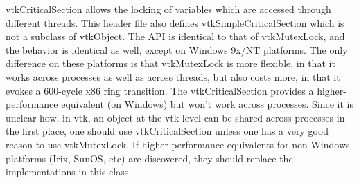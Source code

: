 vtk\-Critical\-Section allows the locking of variables which are accessed through different threads. This header file also defines vtk\-Simple\-Critical\-Section which is not a subclass of vtk\-Object. The A\-P\-I is identical to that of vtk\-Mutex\-Lock, and the behavior is identical as well, except on Windows 9x/\-N\-T platforms. The only difference on these platforms is that vtk\-Mutex\-Lock is more flexible, in that it works across processes as well as across threads, but also costs more, in that it evokes a 600-\/cycle x86 ring transition. The vtk\-Critical\-Section provides a higher-\/performance equivalent (on Windows) but won't work across processes. Since it is unclear how, in vtk, an object at the vtk level can be shared across processes in the first place, one should use vtk\-Critical\-Section unless one has a very good reason to use vtk\-Mutex\-Lock. If higher-\/performance equivalents for non-\/\-Windows platforms (Irix, Sun\-O\-S, etc) are discovered, they should replace the implementations in this class

